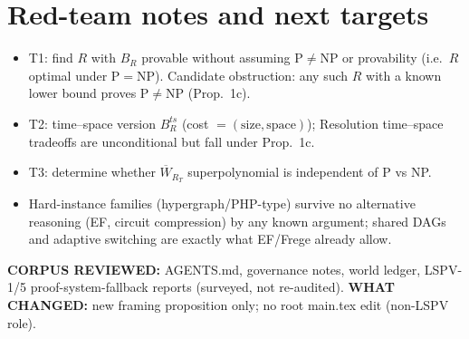 \documentclass{article}
\begin{document}
\section*{Red-team notes and next targets}
\begin{itemize}
\item T1: find $R$ with $B_R$ provable without assuming $\mathrm P\ne\mathrm{NP}$ or provability (i.e.\ $R$ optimal under $\mathrm P=\mathrm{NP}$). Candidate obstruction: any such $R$ with a known lower bound proves $\mathrm P\ne\mathrm{NP}$ (Prop.\ 1c).
\item T2: time--space version $B_R^{ts}$ (cost $=(\text{size},\text{space})$); Resolution time--space tradeoffs are unconditional but fall under Prop.\ 1c.
\item T3: determine whether $\overline W_{R_T}$ superpolynomial is independent of $\mathrm P$ vs NP.
\item Hard-instance families (hypergraph/PHP-type) survive no alternative reasoning (EF, circuit compression) by any known argument; shared DAGs and adaptive switching are exactly what EF/Frege already allow.
\end{itemize}
\textbf{CORPUS REVIEWED:} AGENTS.md, governance notes, world ledger, LSPV-1/5 proof-system-fallback reports (surveyed, not re-audited). \textbf{WHAT CHANGED:} new framing proposition only; no root main.tex edit (non-LSPV role).
\end{document}
